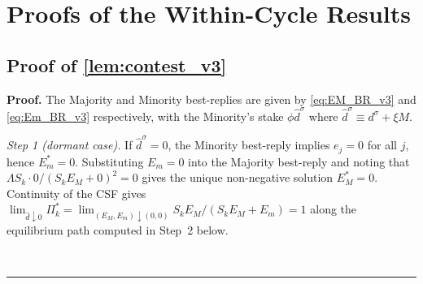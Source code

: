 \documentclass[11pt,twoside]{extarticle}
\newenvironment{proof}[1][Proof]{\noindent \textbf{#1.} }{\ \rule{0.5em}{0.5em}}
\begin{document}



\section{Proofs of the Within-Cycle Results} \label{app:proofs_v3}

\subsection*{Proof of \autoref{lem:contest_v3}} \label{app:proof:contest_v3}
\begin{proof}
The Majority and Minority best-replies are given by \autoref{eq:EM_BR_v3} and \autoref{eq:Em_BR_v3} respectively, with the Minority's stake $\phi\hat d^\sigma$ where $\hat d^\sigma\equiv d^\sigma+\xi M$.

\emph{Step 1 (dormant case).} If $\hat d^\sigma=0$, the Minority best-reply implies $e_j=0$ for all $j$, hence $E_m^*=0$. Substituting $E_m=0$ into the Majority best-reply and noting that $\Lambda S_k\cdot 0/(S_kE_M+0)^2=0$ gives the unique non-negative solution $E_M^*=0$. Continuity of the CSF gives $\lim_{\hat d\downarrow 0}\Pi_k^*=\lim_{(E_M,E_m)\downarrow(0,0)}S_kE_M/(S_kE_M+E_m)=1$ along the equilibrium path computed in Step~2 below.


\end{proof}
\end{document}
